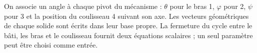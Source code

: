 \begin{corrigebox}
On associe un angle à chaque pivot du mécanisme : $\theta$ pour le bras 1,
$\varphi$ pour 2, $\psi$ pour 3 et la position du coulisseau 4 suivant son axe.
Les vecteurs géométriques de chaque solide sont écrits dans leur base propre.
La fermeture du cycle entre le bâti, les bras et le coulisseau fournit deux
équations scalaires ; un seul paramètre peut être choisi comme entrée.
\end{corrigebox}
